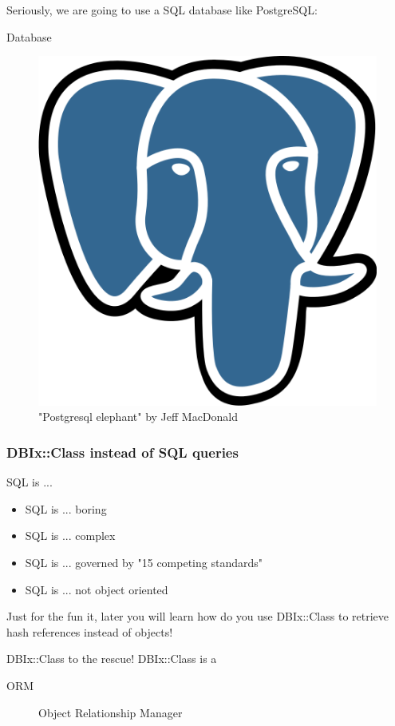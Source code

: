 Seriously, we are going to use a SQL database like
PostgreSQL:

\begin{frame}{Database}
\begin{figure}[!ht]
\centering
\includegraphics[width=0.4\linewidth]{img/postgresql.png}
\caption{"Postgresql elephant" by Jeff MacDonald}
\end{figure}
\end{frame}

\subsubsection{DBIx::Class instead of SQL queries}

\begin{frame}{SQL is ...}
\begin{itemize}
\item SQL is ... boring
\item SQL is ... complex
\item SQL is ... governed by "15 competing standards"
\item SQL is ... not object oriented
\end{itemize}
\end{frame}


Just for the fun it, later you will learn how do you
use DBIx::Class to retrieve hash references instead of
objects!

\begin{frame}{DBIx::Class to the rescue!}
\centering
DBIx::Class is a
\begin{description}
\item[ORM] Object Relationship Manager
\end{description}
\end{frame}


